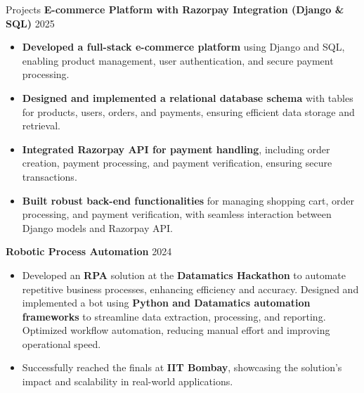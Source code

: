 \documentclass{resume} %
\begin{document}
\begin{rSection}{Projects}
\textbf{E-commerce Platform with Razorpay Integration (Django \& SQL)} \hfill 2025\
 \begin{itemize}
    \item \textbf{Developed a full-stack e-commerce platform} using Django and SQL, enabling product management, user authentication, and secure payment processing.
    \item \textbf{Designed and implemented a relational database schema} with tables for products, users, orders, and payments, ensuring efficient data storage and retrieval.
    \item \textbf{Integrated Razorpay API for payment handling}, including order creation, payment processing, and payment verification, ensuring secure transactions.
    \item \textbf{Built robust back-end functionalities} for managing shopping cart, order processing, and payment verification, with seamless interaction between Django models and Razorpay API.

 \end{itemize}
 

\textbf{Robotic Process Automation} \hfill 2024\
 \begin{itemize}
   \item
    Developed an \textbf{RPA} solution at the \textbf{Datamatics Hackathon} to automate repetitive business processes, enhancing efficiency and accuracy. Designed and implemented a bot using \textbf{Python and Datamatics automation frameworks} to streamline data extraction, processing, and reporting. Optimized workflow automation, reducing manual effort and improving operational speed. 
    \item Successfully reached the finals at \textbf{IIT Bombay}, showcasing the solution’s impact and scalability in real-world applications.
 \end{itemize}
 

\end{rSection}
\end{document}
